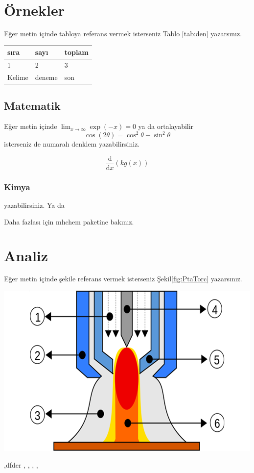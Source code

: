 \lipsum[1-2]
\section{Örnekler}
Eğer metin içinde tabloya referans vermek isterseniz Tablo \ref{tab:den} yazarsınız. 
{
\begin{tabular}{|l|l|l|}
\hline
sıra   & sayı   & toplam \\ \hline
1      & 2      & 3      \\ \hline
Kelime & deneme & son    \\ \hline
\end{tabular}
}

\subsection{Matematik}
Eğer metin içinde \(\lim_{x \to \infty} \exp(-x) = 0\) ya da ortalayabilir
\begin{displaymath}
\cos (2\theta) = \cos^2 \theta - \sin^2 \theta
\end{displaymath}
isterseniz de numaralı denklem yazabilirsiniz.

\begin{equation}
\frac{\mathrm d}{\mathrm d x} \left( k g(x) \right)
\end{equation}
\subsubsection{Kimya}
 yazabilirsiniz. Ya da


Daha fazlası için mhchem paketine bakınız.
 
\section{Analiz}
Eğer metin içinde şekile referans vermek isterseniz Şekil\ref{fig:PtaTorc} yazarsınız. 

{\includegraphics[width=\textwidth]{gorseller/ptaTorc}}
\lipsum[1-2]
\parencite{celik_microstructure_2013} \parencite{gatto_plasma_2004}
\cite{celik_effects_2011}

\cite{yazdi_microstructure_2015},dfder \cite{keehan_influence_2006}, \cite{guo_microstructure_2014}, \cite{kim_variation_2013}, \cite{xibao_metallurgical_2005-1}, \cite{jin_effect_1997}